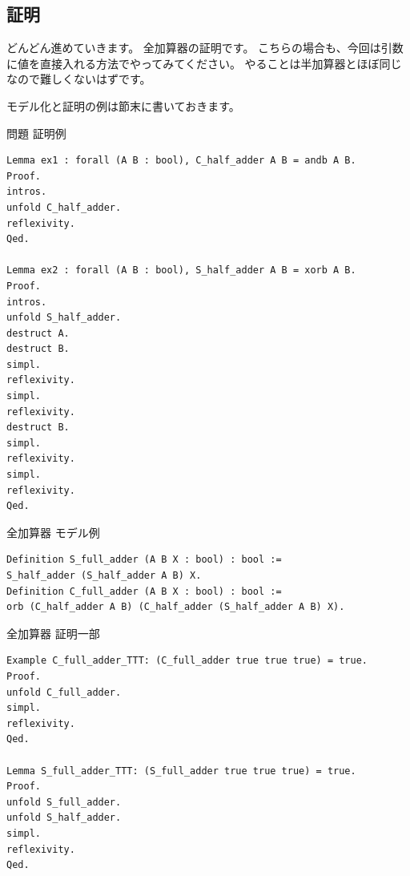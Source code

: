 \documentclass{jsbook}
\begin{document}
\subsection*{証明}
どんどん進めていきます。
全加算器の証明です。
こちらの場合も、今回は引数に値を直接入れる方法でやってみてください。
やることは半加算器とほぼ同じなので難しくないはずです。

モデル化と証明の例は節末に書いておきます。
\newpage
\begin{itembox}[l]{問題 証明例}
\begin{verbatim}
Lemma ex1 : forall (A B : bool), C_half_adder A B = andb A B.
Proof.
intros.
unfold C_half_adder.
reflexivity.
Qed.

Lemma ex2 : forall (A B : bool), S_half_adder A B = xorb A B. 
Proof.
intros.
unfold S_half_adder.
destruct A.
destruct B.
simpl.
reflexivity.
simpl.
reflexivity.
destruct B.
simpl.
reflexivity.
simpl.
reflexivity.
Qed.
\end{verbatim}
\end{itembox}

\begin{itembox}[l]{全加算器 モデル例}
\begin{verbatim}
Definition S_full_adder (A B X : bool) : bool :=
S_half_adder (S_half_adder A B) X.
Definition C_full_adder (A B X : bool) : bool :=
orb (C_half_adder A B) (C_half_adder (S_half_adder A B) X).
\end{verbatim}
\end{itembox}

\begin{itembox}[l]{全加算器 証明一部}
\begin{verbatim}
Example C_full_adder_TTT: (C_full_adder true true true) = true.
Proof.
unfold C_full_adder.
simpl.
reflexivity.
Qed.

Lemma S_full_adder_TTT: (S_full_adder true true true) = true.
Proof.
unfold S_full_adder.
unfold S_half_adder.
simpl.
reflexivity.
Qed.
\end{verbatim}
\end{itembox}
\end{document}
